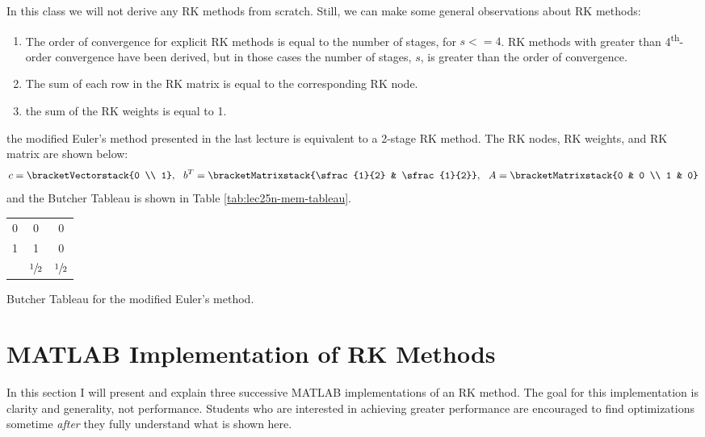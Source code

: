 In this class we will not derive any RK methods from scratch.  Still, we can make some general observations about RK methods:
\begin{enumerate}
\item The order of convergence for explicit RK methods is equal to the number of stages, for $s<=4$.  RK methods with greater than 4\textsuperscript{th}-order convergence have been derived, but in those cases the number of stages, $s$, is greater than the order of convergence.

\item The sum of each row in the RK matrix is equal to the corresponding RK node.
\item the sum of the RK weights is equal to 1.
\end{enumerate}

 the modified Euler's method presented in the last lecture is equivalent to a 2-stage RK method. The RK nodes, RK weights, and RK matrix are shown below:
\begin{equation*}
c = \bracketVectorstack{0 \\ 1}, \ \ b^{T} = \bracketMatrixstack{\sfrac{1}{2} & \sfrac{1}{2}}, \ \ A = \bracketMatrixstack{0 & 0 \\ 1 & 0}
\end{equation*}
and the Butcher Tableau is shown in Table \ref{tab:lec25n-mem-tableau}.
\begin{margintable}
\begin{tabular}{c|cc}
0 & 0 & 0 \\
1 & 1 & 0 \\ \hline
  & $\sfrac{1}{2}$ & $\sfrac{1}{2}$ \\
\end{tabular}
\caption{Butcher Tableau for the modified Euler's method.}
\label{tab:lec25n-mem-tableau}
\end{margintable}

\section{MATLAB Implementation of RK Methods}

In this section I will present and explain three successive MATLAB implementations of an RK method.  The goal for this implementation is clarity and generality, not performance.  Students who are interested in achieving greater performance are encouraged to find optimizations sometime \emph{after} they fully understand what is shown here.

